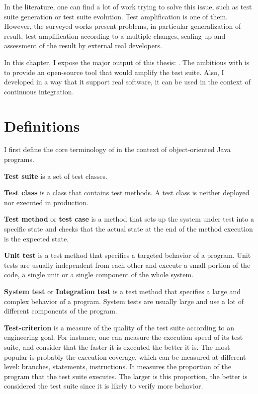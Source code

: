 In the literature, one can find a lot of work trying to solve this issue, such as test suite generation or test suite evolution.
Test amplification is one of them.
However, the surveyed works present problems, in particular generalization of result, test amplification according to a multiple changes, scaling-up and assessment of the result by external real developers.

In this chapter, I expose the major output of this thesis: \dspot.
The ambitious with \dspot is to provide an open-source tool that would amplify the test suite.
Also, I developed \dspot in a way that it support real software, it can be used in the context of continuous integration.

\section{Definitions}
\label{sec:dspot:definitions}

I first define the core terminology of \dspot in the context of object-oriented Java programs.

\textbf{Test suite} is a set of test classes.

\textbf{Test class} is a class that contains test methods. 
A test class is neither deployed nor executed in production.

\textbf{Test method} or \textbf{test case} is a method that sets up the system under test into a specific state and checks that the actual state at the end of the method execution is the expected state.

\textbf{Unit test} is a test method that specifies a targeted behavior of a program. 
Unit tests are usually independent from each other and execute a small portion of the code, \ie a single unit or a single component of the whole system.

\textbf{System test} or \textbf{Integration test} is a test method that specifies a large and complex behavior of a program.
System tests are usually large and use a lot of different components of the program.

\textbf{Test-criterion} is a measure of the quality of the test suite according to an engineering goal.
For instance, one can measure the execution speed of its test suite, and consider that the faster it is executed the better it is.
The most popular is probably the execution coverage, which can be measured at different level: branches, statements, instructions.
It measures the proportion of the program that the test suite executes.
The larger is this proportion, the better is considered the test suite since it is likely to verify more behavior.

